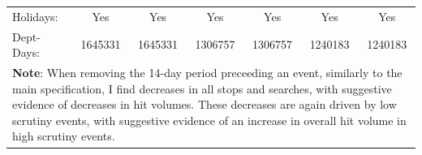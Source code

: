 \begin{tabular}{l*{6}{c}}
Holidays:   &         Yes         &         Yes         &         Yes         &         Yes         &         Yes         &         Yes         \\
Dept-Days:  &     1645331         &     1645331         &     1306757         &     1306757         &     1240183         &     1240183         \\
\hline \multicolumn{7}{p{\linewidth}}{\textbf{Note}: When removing the 14-day period preceeding an event, similarly to the main specification, I find decreases in all stops and searches, with suggestive evidence of decreases in hit volumes. These decreases are again driven by low scrutiny events, with suggestive evidence of an increase in overall hit volume in high scrutiny events.} \\ \hline \end{tabular}
